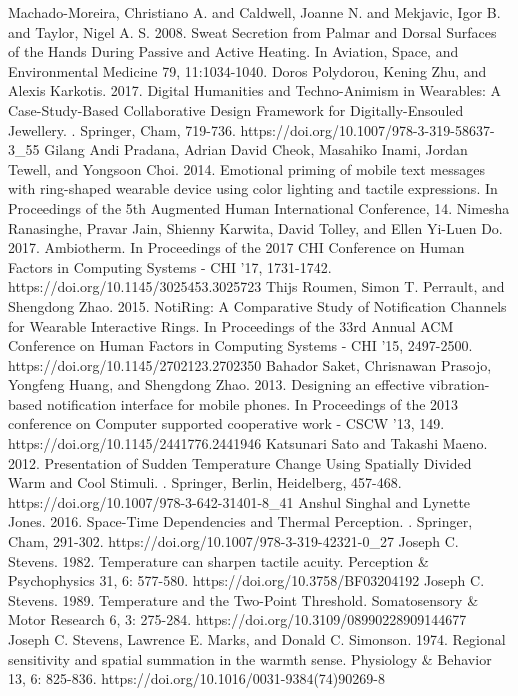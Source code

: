 \documentclass[preprint,12pt]{elsarticle}
\begin{document}
\begin{thebibliography}{00}
Machado-Moreira, Christiano A. and Caldwell, Joanne N. and Mekjavic, Igor B. and Taylor, Nigel A. S. 2008. Sweat Secretion from Palmar and Dorsal Surfaces of the Hands During Passive and Active Heating. In Aviation, Space, and Environmental Medicine 79, 11:1034-1040.
Doros Polydorou, Kening Zhu, and Alexis Karkotis. 2017. Digital Humanities and Techno-Animism in Wearables: A Case-Study-Based Collaborative Design Framework for Digitally-Ensouled Jewellery. . Springer, Cham, 719-736. https://doi.org/10.1007/978-3-319-58637-3\_55
Gilang Andi Pradana, Adrian David Cheok, Masahiko Inami, Jordan Tewell, and Yongsoon Choi. 2014. Emotional priming of mobile text messages with ring-shaped wearable device using color lighting and tactile expressions. In Proceedings of the 5th Augmented Human International Conference, 14.
Nimesha Ranasinghe, Pravar Jain, Shienny Karwita, David Tolley, and Ellen Yi-Luen Do. 2017. Ambiotherm. In Proceedings of the 2017 CHI Conference on Human Factors in Computing Systems - CHI '17, 1731-1742. https://doi.org/10.1145/3025453.3025723
Thijs Roumen, Simon T. Perrault, and Shengdong Zhao. 2015. NotiRing: A Comparative Study of Notification Channels for Wearable Interactive Rings. In Proceedings of the 33rd Annual ACM Conference on Human Factors in Computing Systems - CHI '15, 2497-2500. https://doi.org/10.1145/2702123.2702350
Bahador Saket, Chrisnawan Prasojo, Yongfeng Huang, and Shengdong Zhao. 2013. Designing an effective vibration-based notification interface for mobile phones. In Proceedings of the 2013 conference on Computer supported cooperative work - CSCW '13, 149. https://doi.org/10.1145/2441776.2441946
Katsunari Sato and Takashi Maeno. 2012. Presentation of Sudden Temperature Change Using Spatially Divided Warm and Cool Stimuli. . Springer, Berlin, Heidelberg, 457-468. https://doi.org/10.1007/978-3-642-31401-8\_41
Anshul Singhal and Lynette Jones. 2016. Space-Time Dependencies and Thermal Perception. . Springer, Cham, 291-302. https://doi.org/10.1007/978-3-319-42321-0\_27
Joseph C. Stevens. 1982. Temperature can sharpen tactile acuity. Perception \& Psychophysics 31, 6: 577-580. https://doi.org/10.3758/BF03204192
Joseph C. Stevens. 1989. Temperature and the Two-Point Threshold. Somatosensory \& Motor Research 6, 3: 275-284. https://doi.org/10.3109/08990228909144677
Joseph C. Stevens, Lawrence E. Marks, and Donald C. Simonson. 1974. Regional sensitivity and spatial summation in the warmth sense. Physiology \& Behavior 13, 6: 825-836. https://doi.org/10.1016/0031-9384(74)90269-8

\end{thebibliography}
\end{document}
